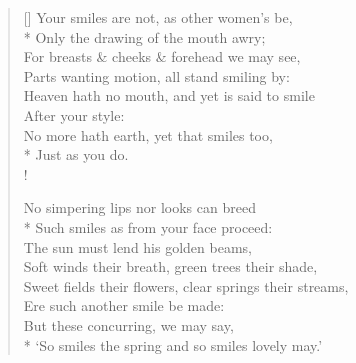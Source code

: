 \documentclass[MAIN]{subfiles}
\begin{document}
\settowidth{\versewidth}{Heaven hath no mouth, and yet is said to smile}
\begin{verse}[\versewidth]
Your smiles are not, as other women's be,\\*
\vin Only the drawing of the mouth awry;\\
For breasts \& cheeks \& forehead we may see,\\
\vin Parts wanting motion, all stand smiling by:\\
Heaven hath no mouth, and yet is said to smile\\
\vin \vin \vin After your style:\\
No more hath earth, yet that smiles too,\\*
\vin \vin \vin Just as you do.\\!

No simpering lips nor looks can breed\\*
Such smiles as from your face proceed:\\
The sun must lend his golden beams,\\
\vin Soft winds their breath, green trees their shade,\\
Sweet fields their flowers, clear springs their streams,\\
\vin Ere such another smile be made:\\
But these concurring, we may say,\\*
`So smiles the spring and so smiles lovely may.'
\end{verse}
\end{document}
